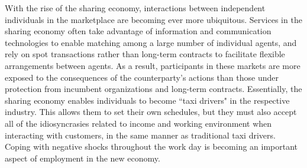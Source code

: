 \documentclass[reviewmode]{AEA}
\begin{document}

With the rise of the sharing economy, interactions between independent individuals in the marketplace are becoming ever more ubiquitous. Services in the sharing economy often take advantage of information and communication technologies to enable matching among a large number of individual agents, and rely on spot transactions rather than long-term contracts to facilitate flexible arrangements between agents. As a result,  participants in these markets are more exposed to the consequences of the counterparty's actions than those under protection from incumbent organizations and long-term contracts. Essentially, the sharing economy enables individuals to become ``taxi drivers" in the respective industry. This allows them to set their own schedules, but they must also accept all of the idiosyncrasies related to income and working environment when interacting with customers, in the same manner as traditional taxi drivers. Coping with negative shocks throughout the work day is becoming an important aspect of employment in the new economy.
\end{document}
